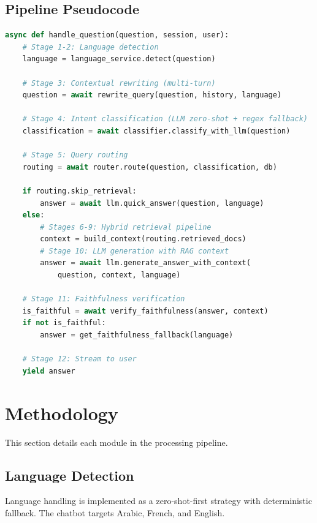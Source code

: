 \documentclass[12pt, a4paper]{article}
\begin{document}
\subsection{Pipeline Pseudocode}

\begin{lstlisting}[language=Python, caption={Simplified pipeline logic (from \texttt{chat\_logic.py}).}]
async def handle_question(question, session, user):
    # Stage 1-2: Language detection
    language = language_service.detect(question)

    # Stage 3: Contextual rewriting (multi-turn)
    question = await rewrite_query(question, history, language)

    # Stage 4: Intent classification (LLM zero-shot + regex fallback)
    classification = await classifier.classify_with_llm(question)

    # Stage 5: Query routing
    routing = await router.route(question, classification, db)

    if routing.skip_retrieval:
        answer = await llm.quick_answer(question, language)
    else:
        # Stages 6-9: Hybrid retrieval pipeline
        context = build_context(routing.retrieved_docs)
        # Stage 10: LLM generation with RAG context
        answer = await llm.generate_answer_with_context(
            question, context, language)

    # Stage 11: Faithfulness verification
    is_faithful = await verify_faithfulness(answer, context)
    if not is_faithful:
        answer = get_faithfulness_fallback(language)

    # Stage 12: Stream to user
    yield answer
\end{lstlisting}


\section{Methodology}
\label{sec:methodology}

This section details each module in the processing pipeline.

\subsection{Language Detection}
\label{sec:langdetect}

Language handling is implemented as a zero-shot-first strategy with
deterministic fallback. The chatbot targets Arabic, French, and English.
\end{document}
